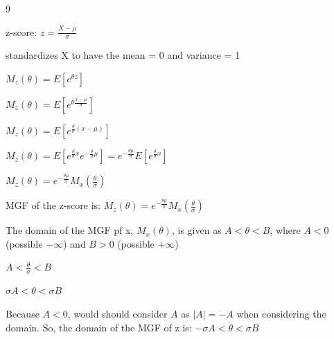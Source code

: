 \documentclass[12 pt]{article}
\begin{document}
    \begin{exercise}{9}
    \hfill

    z-score: $z = \frac{X - \mu}{\sigma}$

    standardizes X to have the mean = 0 and variance = 1

    $M_z(\theta) = E[e^{\theta z}]$

    $M_z(\theta) = E[e^{\theta \frac{x - \mu}{\sigma}}]$

    $M_z(\theta) = E[e^{\frac{\theta}{\sigma}(x- \mu)}]$

    $M_z(\theta) = E[e^{\frac{\theta}{\sigma}x} e^{-\frac{\theta}{\sigma} \mu}] = e^{-\frac{\theta \mu}{\sigma}} E[e^{\frac{\theta}{\sigma}x}]$

    $M_z(\theta) = e^{-\frac{\theta \mu}{\sigma}} M_x(\frac{\theta}{\sigma})$

    MGF of the z-score is: $M_z(\theta) = e^{-\frac{\theta \mu}{\sigma}} M_x(\frac{\theta}{\sigma})$

    \hfill

    The domain of the MGF pf x, $M_x(\theta)$, is given as $A < \theta < B$, where $A < 0$ (possible $-\infty$) and $B>0$ (possible $+\infty$)

    $A< \frac{\theta}{\sigma} < B$

    $\sigma A < \theta < \sigma B$

    Because $A < 0$, would should consider $A$ as $|A| = -A$ when considering the domain. So, the domain of the MGF of z is: $- \sigma A < \theta < \sigma B$

    \hfill
    \end{exercise}
\end{document}
